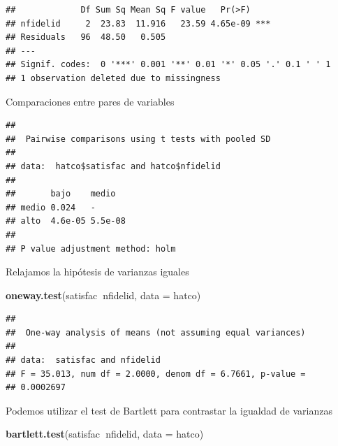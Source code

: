 \documentclass[]{book}
\newenvironment{Shaded}{\begin{snugshade}}{\end{snugshade}}
\newcommand{\DataTypeTok}[1]{\textcolor[rgb]{0.13,0.29,0.53}{#1}}
\newcommand{\KeywordTok}[1]{\textcolor[rgb]{0.13,0.29,0.53}{\textbf{#1}}}
\newcommand{\NormalTok}[1]{#1}
\newcommand{\OperatorTok}[1]{\textcolor[rgb]{0.81,0.36,0.00}{\textbf{#1}}}
\begin{document}
\begin{verbatim}
##             Df Sum Sq Mean Sq F value   Pr(>F)    
## nfidelid     2  23.83  11.916   23.59 4.65e-09 ***
## Residuals   96  48.50   0.505                     
## ---
## Signif. codes:  0 '***' 0.001 '**' 0.01 '*' 0.05 '.' 0.1 ' ' 1
## 1 observation deleted due to missingness
\end{verbatim}

Comparaciones entre pares de variables

\begin{Shaded}
\end{Shaded}

\begin{verbatim}
## 
##  Pairwise comparisons using t tests with pooled SD 
## 
## data:  hatco$satisfac and hatco$nfidelid 
## 
##       bajo    medio  
## medio 0.024   -      
## alto  4.6e-05 5.5e-08
## 
## P value adjustment method: holm
\end{verbatim}

Relajamos la hipótesis de varianzas iguales

\begin{Shaded}
\begin{Highlighting}[]
\KeywordTok{oneway.test}\NormalTok{(satisfac}\OperatorTok{~}\NormalTok{nfidelid, }\DataTypeTok{data =}\NormalTok{ hatco)}
\end{Highlighting}
\end{Shaded}

\begin{verbatim}
## 
##  One-way analysis of means (not assuming equal variances)
## 
## data:  satisfac and nfidelid
## F = 35.013, num df = 2.0000, denom df = 6.7661, p-value =
## 0.0002697
\end{verbatim}

Podemos utilizar el test de Bartlett para contrastar la igualdad de varianzas

\begin{Shaded}
\begin{Highlighting}[]
\KeywordTok{bartlett.test}\NormalTok{(satisfac}\OperatorTok{~}\NormalTok{nfidelid, }\DataTypeTok{data =}\NormalTok{ hatco)}
\end{Highlighting}
\end{Shaded}
\end{document}
